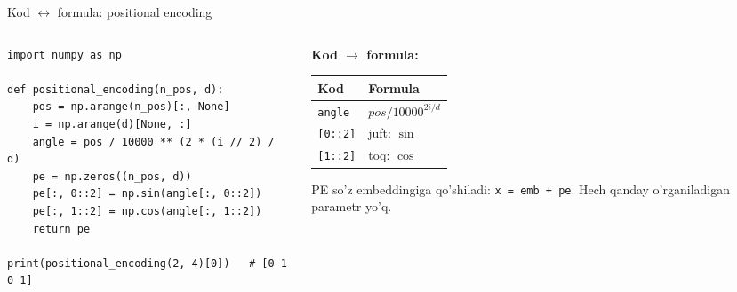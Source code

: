 \documentclass[aspectratio=169,11pt]{beamer}
\begin{document}
\begin{frame}[fragile]{Kod $\leftrightarrow$ formula: positional encoding}
  \begin{columns}[T]
    \begin{column}{0.58\textwidth}
\begin{lstlisting}
import numpy as np

def positional_encoding(n_pos, d):
    pos = np.arange(n_pos)[:, None]
    i = np.arange(d)[None, :]
    angle = pos / 10000 ** (2 * (i // 2) / d)
    pe = np.zeros((n_pos, d))
    pe[:, 0::2] = np.sin(angle[:, 0::2])
    pe[:, 1::2] = np.cos(angle[:, 1::2])
    return pe

print(positional_encoding(2, 4)[0])   # [0 1 0 1]
\end{lstlisting}
    \end{column}
    \begin{column}{0.38\textwidth}
      \textbf{Kod $\to$ formula:}\\[3pt]
      \footnotesize
      \begin{tabular}{p{1.8cm}p{2.0cm}}
        \toprule
        Kod & Formula \\
        \midrule
        \texttt{angle} & $pos/10000^{2i/d}$ \\
        \texttt{[0::2]} & juft: $\sin$ \\
        \texttt{[1::2]} & toq: $\cos$ \\
        \bottomrule
      \end{tabular}
      \vspace{4pt}
      \begin{tcolorbox}[okbox,top=2pt,bottom=2pt]
        \footnotesize
        PE so'z embeddingiga qo'shiladi: \texttt{x = emb + pe}. Hech qanday
        o'rganiladigan parametr yo'q.
      \end{tcolorbox}
    \end{column}
  \end{columns}
\end{frame}
\end{document}
